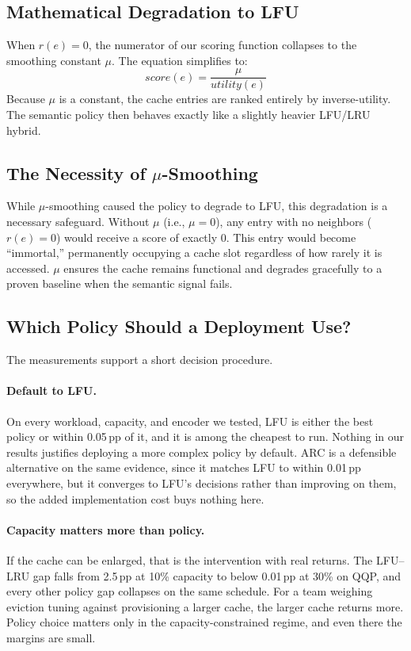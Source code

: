 \documentclass[sigconf,nonacm]{acmart}
\begin{document}
\subsection{Mathematical Degradation to LFU}
When $r(e) = 0$, the numerator of our scoring function collapses to the smoothing constant $\mu$. The equation simplifies to:
\begin{equation}
\mathit{score}(e) = \frac{\mu}{\mathit{utility}(e)}
\end{equation}
Because $\mu$ is a constant, the cache entries are ranked entirely by inverse-utility. The semantic policy then behaves exactly like a slightly heavier LFU/LRU hybrid.

\subsection{The Necessity of $\mu$-Smoothing}
\label{sec:mu}
While $\mu$-smoothing caused the policy to degrade to LFU, this degradation is a necessary safeguard. Without $\mu$ (i.e., $\mu=0$), any entry with no neighbors ($r(e)=0$) would receive a score of exactly 0. This entry would become ``immortal,'' permanently occupying a cache slot regardless of how rarely it is accessed. $\mu$ ensures the cache remains functional and degrades gracefully to a proven baseline when the semantic signal fails.

\subsection{Which Policy Should a Deployment Use?}
\label{sec:guidance}

The measurements support a short decision procedure.

\paragraph{Default to LFU.} On every workload, capacity, and encoder we tested, LFU is either the best policy or within 0.05\,pp of it, and it is among the cheapest to run. Nothing in our results justifies deploying a more complex policy by default. ARC is a defensible alternative on the same evidence, since it matches LFU to within 0.01\,pp everywhere, but it converges to LFU's decisions rather than improving on them, so the added implementation cost buys nothing here.

\paragraph{Capacity matters more than policy.} If the cache can be enlarged, that is the intervention with real returns. The LFU--LRU gap falls from 2.5\,pp at 10\% capacity to below 0.01\,pp at 30\% on QQP, and every other policy gap collapses on the same schedule. For a team weighing eviction tuning against provisioning a larger cache, the larger cache returns more. Policy choice matters only in the capacity-constrained regime, and even there the margins are small.
\end{document}
